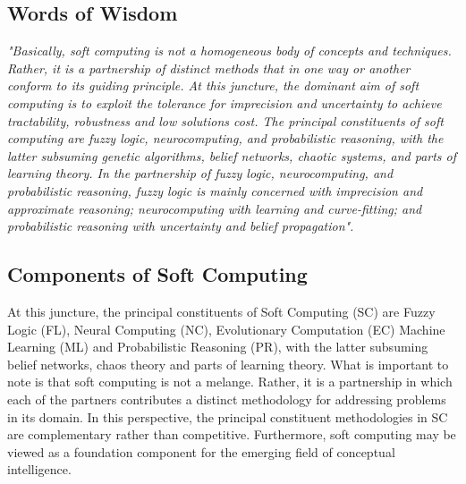 \documentclass[12pt]{article} %
\begin{document}
\subsection{Words of Wisdom}
\textit{"Basically, soft computing is not a homogeneous body of concepts and techniques. Rather, it is a partnership of distinct methods that in one way or another conform to its guiding principle. At this juncture, the dominant aim of soft computing is to exploit the tolerance for imprecision and uncertainty to achieve tractability, robustness and low solutions cost. The principal constituents of soft computing are fuzzy logic, neurocomputing, and probabilistic reasoning, with the latter subsuming genetic algorithms, belief networks, chaotic systems, and parts of learning theory. In the partnership of fuzzy logic, neurocomputing, and probabilistic reasoning, fuzzy logic is mainly concerned with imprecision and approximate reasoning; neurocomputing with learning and curve-fitting; and probabilistic reasoning with uncertainty and belief propagation".}

\subsection{Components of Soft Computing}
At this juncture, the principal constituents of Soft Computing (SC) are Fuzzy Logic (FL), Neural Computing (NC), Evolutionary Computation (EC) Machine Learning (ML) and Probabilistic Reasoning (PR), with the latter subsuming belief networks, chaos theory and parts of learning theory. What is important to note is that soft computing is not a melange. Rather, it is a partnership in which each of the partners contributes a distinct methodology for addressing problems in its domain. In this perspective, the principal constituent methodologies in SC are complementary rather than competitive. Furthermore, soft computing may be viewed as a foundation component for the emerging field of conceptual intelligence.
\end{document}
